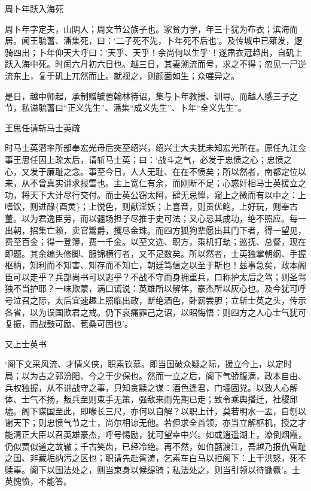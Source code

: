 \documentclass[]{article}
\begin{document}
周卜年跃入海死

周卜年字定夫，山阴人；周文节公族子也。家贫力学，年三十犹为布衣；滨海而居。闻王毓蓍、潘集死，曰：`二子死不先，卜年死不后也'。及传城中已薙发，逻骑四出；卜年仰天大呼曰：`天乎、天乎！余尚何以生乎'！遂肃衣冠趋出，自矶上跃入海中死。时闰六月初六日也。越三日，其妻溯流而号，求之不得；忽见一尸逆流东上，复于矶上兀然而止。就视之，则颜面如生；众嗟异之。

是日，越中师起，承制赠毓蓍翰林待诏，集与卜年教授、训导。而越人感三子之节，私谥毓蓍曰``正义先生''、潘集``成义先生''、卜年``全义先生''。

王思任请斩马士英疏

时马士英潜率所部奉宏光母后突至绍兴，绍兴士大夫犹未知宏光所在。原任九江佥事王思任因上疏太后，请斩马士英；曰：`战斗之气，必发于忠愤之心；忠愤之心，又发于廉耻之念。事至今日，人人无耻、在在不愤矣；所以然者，南都定位以来，从不曾真实讲求报雪也。主上宽仁有余，而刚断不足；心惑奸相马士英援立之功，将天下大计尽行交付。而士英公窃太阿，肆无忌惮，窥上之微而有以中之：上嗜饮，则进醁\{酉灵\}；上悦色，则献淫妖；上喜音，则贡优鲍，上好玩，则奉古董。以为君逸臣劳，而以疆场担子尽推于史可法；又心忌其成功，绝不照应。每一出朝，招集亡赖，卖官鬻爵，攫尽金珠。而四方狐狗辈愿出其门下者，得一望见，费至百金；得一登簿，费一千金。以至文选、职方，乘机打劫；巡抚、总督，现在即题。其余编头修脚、服锦横行者，又不足数矣。所以然者，士英独掌朝纲、手握枢柄，知利而不知害、知存而不知亡，朝廷笃信之以至于斯也！兹事急矣，政本阁臣可以走乎？兵部尚书可以逃乎？不战不守而身拥重兵，口称护太后之驾；则圣驾独不当护耶？一味欺蒙，满口谎说：英雄所以解体，豪杰所以灰心也。及今犹可呼号泣召之际，太后宜速趣上照临出政，断绝酒色，卧薪尝胆；立斩士英之头，传示各省，以为误国欺君之戒。仍下哀痛罪己之诏，以昭悔悟：则四方之人心士气犹可复振，而战鼓可励、苞桑可固也'。

又上士英书

`阁下文采风流、才情义侠，职素钦慕。即当国破众疑之际，援立今上，以定时局；以为古之郭汾阳、今之于少保也。然而一立之后，阁下气骄腹满，政本自由、兵权独握，从不讲战守之事，只知贪黩之谋：酒色逢君，门墙固党。以致人心解体、士气不扬，叛兵至则束手无策，强敌来而先期已走；致令乘舆播迁，社稷邱墟。阁下谋国至此，即喙长三尺，亦何以自解？以职上计，莫若明水一盂，自刎以谢天下；则忠愤气节之士，尚尔相谅无他。若但求全首领，亦当立解枢机，授之才能清正大臣以召英雄豪杰，呼号惕励，犹可望幸中兴。如或逍遥湖上，潦倒烟霞，仍似贾似道之故辙；千古笑齿，已经冷绝。再不然，如伯嚭渡江，吾越乃报仇雪耻之国、非藏垢纳污之区也；职请先赴胥涛，乞素车白马以拒阁下：上干洪怒，死不赎辜。阁下以国法处之，则当束身以候缇骑；私法处之，则当引领以待锄麑'。士英愧愤，不能答。
\end{document}

